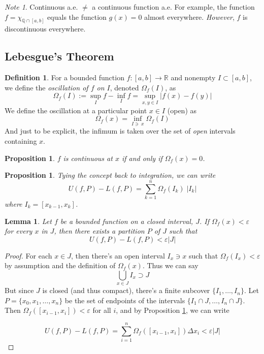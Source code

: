 \documentclass[12pt]{article}
\theoremstyle{plain}
\newtheorem{lem}[thm]{Lemma}
\newtheorem{prop}[thm]{Proposition}
\theoremstyle{definition}
\newtheorem{defn}[thm]{Definition}
\theoremstyle{remark}
\newtheorem*{note}{Note}
\begin{document}
\begin{note}
Continuous a.e. $\neq$ a continuous function a.e. For example, the function $f=\chi_{\mathbb{Q} \cap [a,b]}$ equals the function $g(x)=0$ almost everywhere. \emph{However}, $f$ is discontinuous everywhere. 
\end{note}

\subsection{Lebesgue's Theorem}

\begin{defn} 
For a bounded function $f:[a,b]\rightarrow\mathbb{R}$ and nonempty $I\subset[a,b]$, we define the \emph{oscillation of $f$ on $I$}, denoted $\Omega_f(I)$, as
\[
    \Omega_f(I) := \sup_I f - \inf_I f 
    = \sup_{x,y\in I} |f(x)-f(y)|
\]
We define the oscillation at a particular point $x\in I$ (open) as 
\[
\Omega_f(x) = \inf_{I\ni \; x} \Omega_f(I)
\]
And just to be explicit, the infimum is taken over the set of \emph{open} intervals containing $x$.
\end{defn}

\begin{prop}
\label{osccts}
$f$ is continuous at $x$ if and only if $\Omega_f(x)=0$.
\end{prop}

\begin{prop}
\label{rewriteuml}
Tying the concept back to integration, we can write 
\[
    U(f,P)-L(f,P) 
    = \sum^n_{k=1} \Omega_f(I_k) \; |I_k|
\]
where $I_k = [x_{k-1}, x_k]$.
\end{prop}

\begin{lem}
    \label{leblem}
Let $f$ be a bounded function on a closed interval, $J$. If $\Omega_f(x) < \varepsilon$ for every $x$ in $J$, then there exists a partition $P$ of $J$ such that 
\[
    U(f,P)- L(f,P) < \varepsilon |J|
\]
\end{lem}

\begin{proof}
For each $x\in J$, then there's an open interval $I_x \ni x$ such that $\Omega_f(I_x)<\varepsilon$ by assumption and the definition of $\Omega_f(x)$. Thus we can say 
\[
    \bigcup_{x\in J} I_x \supset J
\]
But since $J$ is closed (and thus compact), there's a finite subcover $\{I_1, \ldots, I_n\}$. Let $P=\{x_0, x_1, \ldots, x_n\}$ be the set of endpoints of the intervals $\{I_1\cap J, \ldots, I_n\cap J\}$. Then $\Omega_f([x_{i-1},x_i])<\varepsilon$ for all $i$, and by Proposition \ref{rewriteuml}, we can write
 
\[
    U(f,P)- L(f,P) = \sum^n_{i=1} \Omega_f([x_{i-1}, x_i]) \Delta 
    x_i < \varepsilon |J|
\]
\end{proof}
\end{document}
